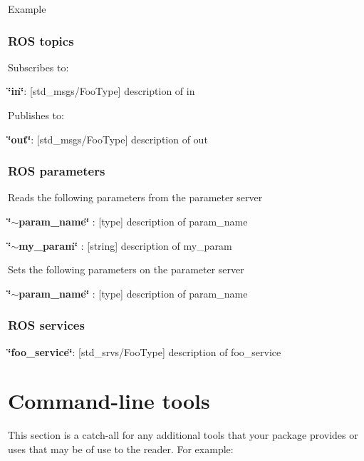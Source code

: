 \begin{DoxyParagraph}{Example}

\end{DoxyParagraph}
\subsubsection{R\-O\-S topics}\label{index_topics}
Subscribes to\-:
\begin{DoxyItemize}
\item {\bfseries \char`\"{}in\char`\"{}}\-: [std\-\_\-msgs/\-Foo\-Type] description of in
\end{DoxyItemize}

Publishes to\-:
\begin{DoxyItemize}
\item {\bfseries \char`\"{}out\char`\"{}}\-: [std\-\_\-msgs/\-Foo\-Type] description of out
\end{DoxyItemize}\subsubsection{R\-O\-S parameters}\label{index_parameters}
Reads the following parameters from the parameter server


\begin{DoxyItemize}
\item {\bfseries \char`\"{}$\sim$param\-\_\-name\char`\"{}} \-: {\bfseries }[type] description of param\-\_\-name
\item {\bfseries \char`\"{}$\sim$my\-\_\-param\char`\"{}} \-: {\bfseries }[string] description of my\-\_\-param
\end{DoxyItemize}

Sets the following parameters on the parameter server


\begin{DoxyItemize}
\item {\bfseries \char`\"{}$\sim$param\-\_\-name\char`\"{}} \-: {\bfseries }[type] description of param\-\_\-name
\end{DoxyItemize}\subsubsection{R\-O\-S services}\label{index_services}

\begin{DoxyItemize}
\item {\bfseries \char`\"{}foo\-\_\-service\char`\"{}}\-: [std\-\_\-srvs/\-Foo\-Type] description of foo\-\_\-service
\end{DoxyItemize}\section{Command-\/line tools}\label{index_commandline}
This section is a catch-\/all for any additional tools that your package provides or uses that may be of use to the reader. For example\-:


